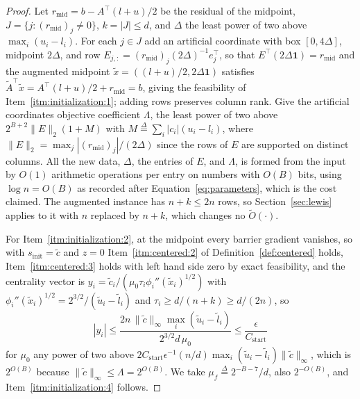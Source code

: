 \documentclass[11pt]{article}
\renewcommand{\O}{\widetilde O}
\newcommand{\defeq}{\stackrel{\Delta}{=}}
\begin{document}
\begin{proof}
Let $r_{\mathrm{mid}} = b - A^\top (l + u)/2$ be the residual of the midpoint,
$J = \{ j : (r_{\mathrm{mid}})_j \ne 0 \}$,
$k = |J| \le d$, and
$\Delta$ the least power of two above
$\max_i (u_i - l_i)$. For each
$j \in J$ add an artificial coordinate with box
$[0, 4\Delta]$, midpoint
$2 \Delta$, and row
$E_{j, :} = (r_{\mathrm{mid}})_j (2 \Delta)^{-1} e_j^\top$, so that
$E^\top (2 \Delta \mathbf{1}) = r_{\mathrm{mid}}$ and the augmented midpoint
$\widetilde{x} = ((l + u)/2, 2 \Delta \mathbf{1})$ satisfies
$\widetilde{A}^\top \widetilde{x} = A^\top (l + u)/2 + r_{\mathrm{mid}} = b$, giving
the feasibility of Item~\ref{itm:initialization:1}; adding rows
preserves column rank. Give the artificial coordinates objective
coefficient $\Lambda$, the least power of two above
$2^{B + 2} \|E\|_2 (1 + M)$ with
$M \defeq \sum_i |c_i| (u_i - l_i)$, where
$\|E\|_2 = \max_j |(r_{\mathrm{mid}})_j| / (2 \Delta)$ since the rows of
$E$ are supported on distinct columns. All the new data,
$\Delta$, the entries of $E$, and
$\Lambda$, is formed from the input by $O(1)$ arithmetic operations per
entry on numbers with $O(B)$ bits, using $\log n = O(B)$ as recorded
after Equation~\eqref{eq:parameters}, which is the cost claimed. The
augmented instance has
$n + k \le 2 n$ rows, so Section~\ref{sec:lewis} applies to it with
$n$ replaced by $n + k$, which changes no
$\O(\cdot)$.

For Item~\ref{itm:initialization:2}, at the midpoint every barrier
gradient vanishes, so with $s_{\mathrm{init}} = \widetilde{c}$ and
$z = 0$ Item~\ref{itm:centered:2} of Definition~\ref{def:centered}
holds, Item~\ref{itm:centered:3} holds with left hand side zero by
exact feasibility, and the centrality vector is
$y_i = \widetilde{c}_i / (\mu_0 \tau_i \phi_i''(\widetilde{x}_i)^{1/2})$
with $\phi_i''(\widetilde{x}_i)^{1/2} = 2^{3/2} / (\widetilde u_i - \widetilde l_i)$
and $\tau_i \ge d / (n + k) \ge d / (2 n)$, so
\[
|y_i|
\le
\frac{ 2 n \, \|\widetilde{c}\|_{\infty}
\max_i (\widetilde u_i - \widetilde l_i) }
{ 2^{3/2} d \, \mu_0 }
\le
\frac{\epsilon}{C_{\mathrm{start}}}
\]
for $\mu_0$ any power of two above
$2 C_{\mathrm{start}} \epsilon^{-1} (n / d) \max_i(\widetilde u_i - \widetilde l_i) \|\widetilde c\|_{\infty}$,
which is $2^{O(B)}$ because
$\|\widetilde c\|_{\infty} \le \Lambda = 2^{O(B)}$. We take
$\mu_f \defeq 2^{-B - 7} / d$, also
$2^{-O(B)}$, and Item~\ref{itm:initialization:4} follows.


\end{proof}
\end{document}
